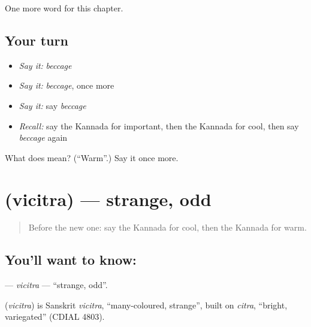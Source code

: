 \begin{grammarlens}[title={What you've built}]
One more word for this chapter.
\end{grammarlens}

\subsection*{Your turn}
\begin{itemize}
\raggedright
  \item \emph{Say it:} \emph{beccage}
  \item \emph{Say it:} \emph{beccage}, once more
  \item \emph{Say it:} say \emph{beccage}
  \item \emph{Recall:} say the Kannada for important, then the Kannada for cool, then say \emph{beccage} again
\end{itemize}

\begin{tcolorbox}[breakable,colback=teal!4,colframe=teal!35!black,title={Before you move on}]
What does  mean? (\textquotedblleft{}Warm\textquotedblright{}.) Say it once more.
\end{tcolorbox}
\section[\texorpdfstring{\kn{ವಿಚಿತ್ರ} (vicitra)}{ವಿಚಿತ್ರ (vicitra)}]{ (vicitra) — strange, odd}

\label{lesson:KA-C291-vicitra}



\begin{quote}
Before the new one: say the Kannada for cool, then the Kannada for warm.
\end{quote}

\subsection*{You'll want to know: }
\textbf{} — \emph{vicitra} — \textquotedblleft{}strange, odd\textquotedblright{}.

\begin{cousinweb}
\textbf{} (\emph{vicitra}) is Sanskrit \emph{vicitra}, \textquotedblleft{}many-coloured, strange\textquotedblright{}, built on \emph{citra}, \textquotedblleft{}bright, variegated\textquotedblright{} (CDIAL 4803).
\end{cousinweb}

